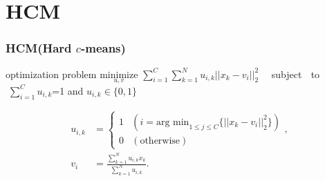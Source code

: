 \documentclass[fleqn,dvipdfmx,10pt]{beamer}
\begin{document}

\section{HCM}
\begin{frame}\frametitle{HCM\scriptsize(Hard $c$-means)}
  \begin{block}{optimization problem}
    $\underset{u,v}{\text{minimize}}$
    $\sum_{i=1}^C\sum_{k=1}^Nu_{i,k}||x_k-v_i||_2^2\quad$ subject
    $\;$ to $\; \sum_{i=1}^Cu_{i,k}$=1 \;and\; $u_{i,k}\in\{0,1\}$
  \end{block}
  \begin{align*}
    u_{i,k}&=\begin{cases}
    1 & (i=\text{arg min}_{1 \leq j \leq C}\{||x_k-v_i||_2^2\}) \\
    0 & (\text{otherwise})
    \end{cases},\\
    v_{i}&=
    \frac{\sum_{k=1}^N u_{i,k}x_{k}}{\sum_{k=1}^N u_{i,k}}.
  \end{align*}
\end{frame}
\end{document}
